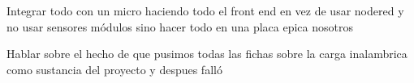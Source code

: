 Integrar todo con un micro haciendo todo el front end en vez de usar nodered y no usar sensores módulos sino hacer todo en una placa epica nosotros

Hablar sobre el hecho de que pusimos todas las fichas sobre la carga inalambrica como sustancia del proyecto y despues falló